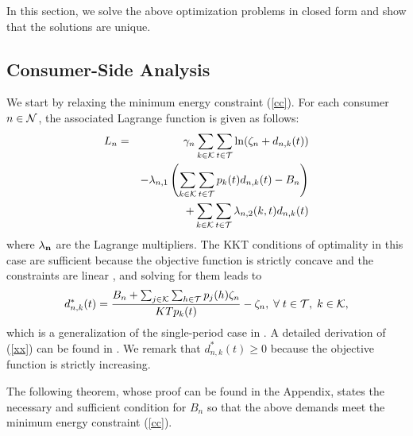 In this section, we solve the above optimization problems in closed form and show that the solutions are unique.


\subsection{Consumer-Side Analysis}
We start by relaxing the minimum energy constraint (\ref{cc}).
  For each consumer $n\in {\cal N}$, the associated Lagrange function is given as follows:
\begin{eqnarray*}
L_n &=& \gamma_n\sum_{k\in {\cal K}}\sum_{t\in {\cal T}}\ln(\zeta_n+d_{n,k}(t))
 \\
&&- \lambda_{n,1}\left(\sum_{k\in {\cal K}}\sum_{t\in {\cal T}}p_k(t)d_{n,k}(t)-B_n\right) \\
&&+\sum_{k\in{\cal K}} \sum_{t\in{\cal T}} \lambda_{n,2}(k,t)d_{n,k}(t)
\end{eqnarray*}
  where ${\bf \lambda_{n}}$ are the Lagrange multipliers. The KKT conditions of optimality in this case are sufficient because the objective function is strictly concave and the constraints are linear \cite{NL}, and solving for them leads to \begin{equation}
d^*_{n,k}(t)= \frac{B_n+\sum_{j\in {\cal K}}\sum_{h\in {\cal T}}p_j(h)\zeta_n}{KTp_k(t)}-\zeta_n,  \; \forall \;t\in {\cal T}, \; k\in {\cal K},  \label{xx}
\end{equation}
which is a generalization of the single-period case in \cite{sabita}. A detailed derivation of (\ref{xx}) can be found in \cite{mywork}. {\color{black} We remark that $d^*_{n,k}(t) \geq 0$  {\color{blue} because the objective function is strictly increasing.}}

The following theorem, whose proof can be found in the Appendix, states the necessary and sufficient condition for $B_n$ so that the above demands meet the minimum energy constraint (\ref{cc}).


